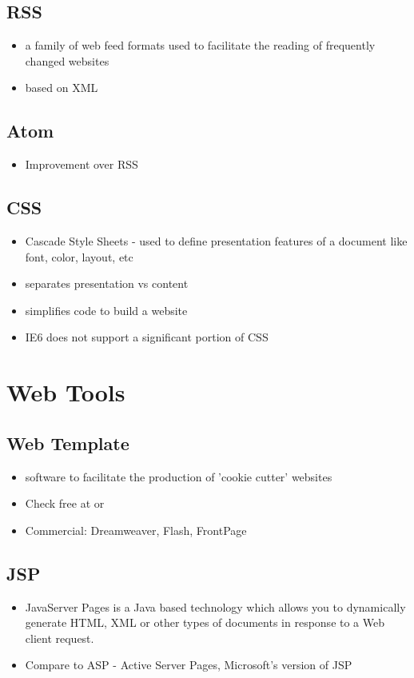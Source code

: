 \documentclass[10pt]
{article}
\begin{document}
\subsection{RSS}
\begin{itemize}
\item a family of web feed formats used to facilitate the reading of frequently changed websites
\item based on XML
\end{itemize}
\subsection{Atom}
\begin{itemize}
\item Improvement over RSS
\end{itemize}
\subsection{CSS}
\begin{itemize}
\item Cascade Style Sheets - used to define presentation features of a document like font, color, layout, etc
\item separates presentation vs content 
\item simplifies code to build a website
\item IE6 does not support a significant portion of CSS
\end{itemize}
\section{Web Tools}
\subsection{Web Template}
\begin{itemize}
\item software to facilitate the production of 'cookie cutter' websites 
\item Check free at  or 
\item Commercial: Dreamweaver, Flash, FrontPage  

\end{itemize}
\subsection{JSP}
\begin{itemize}
\item JavaServer Pages is a Java based technology which allows you to dynamically generate HTML, XML or other types of documents in response to a Web client request. 
\item Compare to ASP - Active Server Pages, Microsoft's version of JSP
\end{itemize}
\end{document}
